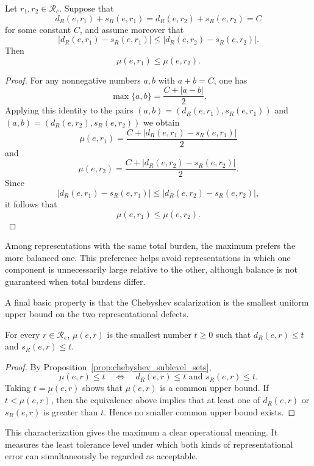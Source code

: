 \begin{proposition}
\label{prop:max_avoids_extremes}
Let $r_1,r_2\in\mathcal R_e$. Suppose that
\[
d_R(e,r_1)+s_R(e,r_1) = d_R(e,r_2)+s_R(e,r_2) = C
\]
for some constant $C$, and assume moreover that
\[
|d_R(e,r_1)-s_R(e,r_1)| \le |d_R(e,r_2)-s_R(e,r_2)|.
\]
Then
\[
\mu(e,r_1)\le\mu(e,r_2).
\]
\end{proposition}

\begin{proof}
For any nonnegative numbers $a,b$ with $a+b=C$, one has
\[
\max\{a,b\} = \frac{C+|a-b|}{2}.
\]
Applying this identity to the pairs $(a,b) = (d_R(e,r_1),s_R(e,r_1))$ and $(a,b) = (d_R(e,r_2),s_R(e,r_2))$ we obtain
\[
\mu(e,r_1) = \frac{ C+|d_R(e,r_1)-s_R(e,r_1)| }{2}
\]
and
\[
\mu(e,r_2) = \frac{ C+|d_R(e,r_2)-s_R(e,r_2)| }{2}.
\]
Since
\[
|d_R(e,r_1)-s_R(e,r_1)| \le |d_R(e,r_2)-s_R(e,r_2)|,
\]
it follows that
\[
\mu(e,r_1)\le\mu(e,r_2).
\]
\end{proof}

Among representations with the same total burden, the maximum prefers the more balanced one. This preference helps avoid representations in which one component is unnecessarily large relative to the other, although balance is not guaranteed when total burdens differ.

A final basic property is that the Chebyshev scalarization is the smallest uniform upper bound on the two representational defects.

\begin{proposition}
\label{prop:max_smallest_common_bound}
For every $r\in\mathcal R_e$, $\mu(e,r)$ is the smallest number $t\ge 0$ such that $d_R(e,r) \le t$ and $s_R(e,r)\le t$.
\end{proposition}
\begin{proof}
By Proposition~\ref{prop:chebyshev_sublevel_sets},
\[
\mu(e,r)\le t \quad\Longleftrightarrow\quad d_R(e,r)\le t \text{ and } s_R(e,r)\le t.
\]
Taking $t=\mu(e,r)$ shows that $\mu(e,r)$ is a common upper bound. If $t<\mu(e,r)$, then the equivalence above
implies that at least one of $d_R(e,r)$ or $s_R(e,r)$ is greater than $t$. Hence no smaller common upper bound exists.
\end{proof}

This characterization gives the maximum a clear operational meaning. It measures the least tolerance level under which both kinds of representational error can simultaneously be regarded as acceptable.


